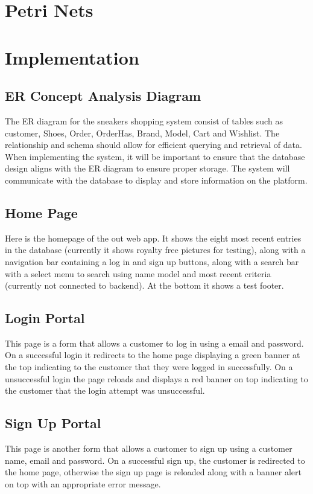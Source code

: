 \section{Petri Nets}
\section{Implementation}
\subsection{ER Concept Analysis Diagram}
\hspace{1cm} The ER diagram for the sneakers shopping system consist of tables such as customer, Shoes, Order,
OrderHas, Brand, Model, Cart and Wishlist. The relationship and schema should allow for efficient
querying and retrieval of data. When implementing the system, it will be important to ensure that the
database design aligns with the ER diagram to ensure proper storage. The system will communicate with
the database to display and store information on the platform.
\subsection{Home Page}
Here is the homepage of the out web app. It shows the eight most recent entries in the database (currently it shows royalty free pictures for testing), along with a navigation bar containing a log in and sign up buttons, along with a search bar with a select menu to search using name model and most recent criteria (currently not connected to backend). At the bottom it shows a test footer.
\subsection{Login Portal}
This page is a form that allows a customer to log in using a email and password. On a successful login it redirects to the home page displaying a green banner at the top indicating to the customer that they were logged in successfully. On a unsuccessful login the page reloads and displays a red banner on top indicating to the customer that the login attempt was unsuccessful.
\subsection{Sign Up Portal}
This page is another form that allows a customer to sign up using a customer name, email and password. On a successful sign up, the customer is redirected to the home page, otherwise the sign up page is reloaded along with a banner alert on top with an appropriate error message.
